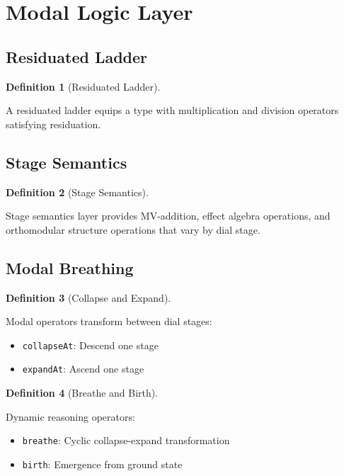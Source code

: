 \documentclass{amsart}
\theoremstyle{definition}
\newtheorem{definition}{Definition}[section]
\theoremstyle{remark}
\begin{document}
\section{Modal Logic Layer}

\subsection{Residuated Ladder}
\label{sec:residuated-ladder}

\begin{definition}[Residuated Ladder]
\label{def:residuated-ladder}
\uses{}

A residuated ladder equips a type with multiplication and division operators satisfying residuation.
\end{definition}

\subsection{Stage Semantics}
\label{sec:stage-semantics}

\begin{definition}[Stage Semantics]
\label{def:stage-semantics}
\uses{}

Stage semantics layer provides MV-addition, effect algebra operations, and orthomodular structure operations that vary by dial stage.
\end{definition}

\subsection{Modal Breathing}
\label{sec:modal-breathing}

\begin{definition}[Collapse and Expand]
\label{def:collapse-expand}

Modal operators transform between dial stages:
\begin{itemize}
\item \texttt{collapseAt}: Descend one stage
\item \texttt{expandAt}: Ascend one stage
\end{itemize}
\end{definition}

\begin{definition}[Breathe and Birth]
\label{def:breathe-birth}

Dynamic reasoning operators:
\begin{itemize}
\item \texttt{breathe}: Cyclic collapse-expand transformation
\item \texttt{birth}: Emergence from ground state
\end{itemize}
\end{definition}
\end{document}
